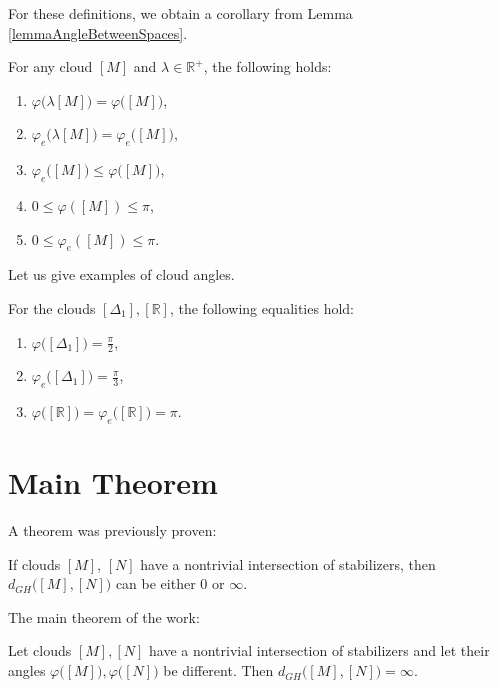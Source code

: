 \documentclass[11pt,twoside
]{article}
\begin{document}
For these definitions, we obtain a corollary from Lemma
\ref{lemmaAngleBetweenSpaces}.
\begin{lemma}
  For any cloud \( [M] \) and \( \lambda \in\mathbb{R}^+ \), the
  following holds\textup{:}\label{lem:angles}
  \begin{enumerate}
    \item \(\varphi \big(\lambda [M]\big) = \varphi
      \big([M]\big)\),\label{lem:angles:1}
    \item \(\varphi_e \big(\lambda [M]\big) = \varphi_e
      \big([M]\big)\),\label{lem:angles:2}
    \item \( \varphi_e \big([M]\big) \le \varphi \big([M]\big)
      \),\label{lem:angles:3}
    \item \(0 \le \varphi ([M]) \le \pi\),\label{lem:angles:4}
    \item \(0 \le \varphi_e ([M]) \le \pi\).\label{lem:angles:5}
  \end{enumerate}
\end{lemma}
Let us give examples of cloud angles.
\begin{lemma}
  For the clouds \( [\Delta _{1}], [\mathbb{R}] \), the following
  equalities hold: \label{lem:angleexam}
  \begin{enumerate}
    \item \( \varphi \big([\Delta _{1}]\big) = \frac{\pi }{2}
      \),\label{lem:angleexam:1}
    \item \( \varphi_e \big([\Delta _{1}]\big) = \frac{\pi }{3}
      \),\label{lem:angleexam:2}
    \item \( \varphi \big([\mathbb{R}]\big) = \varphi_e
      \big([\mathbb{R}]\big) = \pi  \).\label{lem:angleexam:3}
  \end{enumerate}
\end{lemma}
\section{Main Theorem}
A theorem was previously proven:
\begin{theorem}
  If clouds \( [M] \), \( [N] \) have a nontrivial intersection of
  stabilizers, then \( d_{GH}\big([M],[N]\big) \) can be either
  \( 0 \) or \( \infty \).
\end{theorem}
The main theorem of the work:
\begin{theorem}
  Let clouds \( [M], [N] \) have a nontrivial intersection of
  stabilizers and let their angles \( \varphi \big([M]\big),
  \varphi \big([N]\big) \) be different. Then \( d_{GH} \big([M],
  [N]\big) = \infty \).
\end{theorem}
\label{end}
% 
% 
\end{document}
